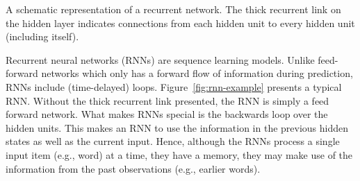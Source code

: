 \begin{marginfigure}
  \centering
  \caption{A schematic representation of a recurrent network.
    The thick recurrent link on the hidden layer indicates
    connections from each hidden unit to every hidden unit
    (including itself).
  }
  \label{fig:rnn-example}
\end{marginfigure}
Recurrent neural networks (RNNs) are sequence learning models.
Unlike feed-forward networks which only has a forward flow of information
during prediction,
RNNs include (time-delayed) loops.
Figure~\ref{fig:rnn-example} presents a typical RNN.
Without the thick recurrent link presented, the RNN is simply
a feed forward network.
What makes RNNs special is the backwards loop over the hidden units.
This makes an RNN to use the information in the previous hidden states
as well as the current input.
Hence, although the RNNs process a single input item (e.g., word)
at a time, they have a memory,
they may make use of the information from the past observations
(e.g., earlier words).

